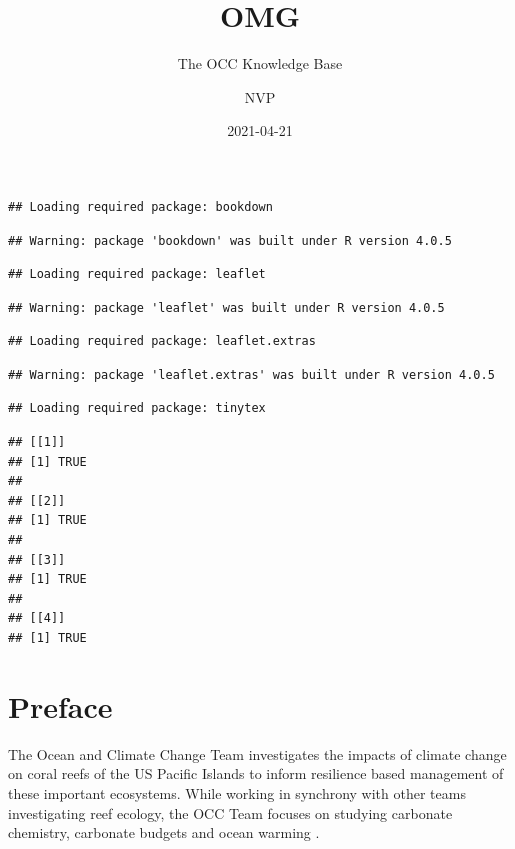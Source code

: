 \documentclass[
]{book}
\title{OMG}
\subtitle{The OCC Knowledge Base}
\author{NVP}
\date{2021-04-21}
\begin{document}
\maketitle

{
\setcounter{tocdepth}{1}
\tableofcontents
}
\begin{verbatim}
## Loading required package: bookdown
\end{verbatim}

\begin{verbatim}
## Warning: package 'bookdown' was built under R version 4.0.5
\end{verbatim}

\begin{verbatim}
## Loading required package: leaflet
\end{verbatim}

\begin{verbatim}
## Warning: package 'leaflet' was built under R version 4.0.5
\end{verbatim}

\begin{verbatim}
## Loading required package: leaflet.extras
\end{verbatim}

\begin{verbatim}
## Warning: package 'leaflet.extras' was built under R version 4.0.5
\end{verbatim}

\begin{verbatim}
## Loading required package: tinytex
\end{verbatim}

\begin{verbatim}
## [[1]]
## [1] TRUE
## 
## [[2]]
## [1] TRUE
## 
## [[3]]
## [1] TRUE
## 
## [[4]]
## [1] TRUE
\end{verbatim}

\hypertarget{preface}{%
\chapter*{Preface}\label{preface}}

The Ocean and Climate Change Team investigates the impacts of climate change on coral reefs of the US Pacific Islands to inform resilience based management of these important ecosystems. While working in synchrony with other teams investigating reef ecology, the OCC Team focuses on studying carbonate chemistry, carbonate budgets and ocean warming .
\end{document}
